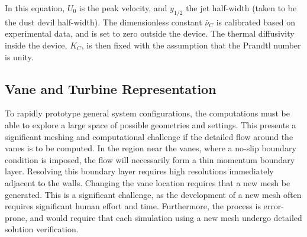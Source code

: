In this equation, $U_0$ is the peak velocity, and $y_{1/2}$ the jet
half-width (taken to be the dust devil half-width).  
The dimensionless constant $\bar \nu_C $ is calibrated based on
experimental data, and is set to zero outside the device. 
The thermal diffusivity inside the device, $K_C$, is then fixed with the 
assumption that the Prandtl number is unity.  




\subsection{Vane and Turbine Representation}
\label{subsec:vane}
To rapidly prototype general system configurations, the
computations must be able to explore a large space of possible
geometries and settings. This presents a significant meshing and 
computational challenge if the detailed flow around the vanes is to be
computed. In the region near the vanes, where a no-slip boundary
condition is imposed, the flow will necessarily form a thin momentum
boundary layer. Resolving this boundary layer requires high resolutions
immediately adjacent to the walls. Changing the vane location requires
that a new mesh be generated.
This is a significant
challenge, as the development of a new mesh often requires significant
human effort and time. Furthermore, the process is error-prone, 
and would require that each simulation using a new mesh undergo 
detailed solution verification. 



